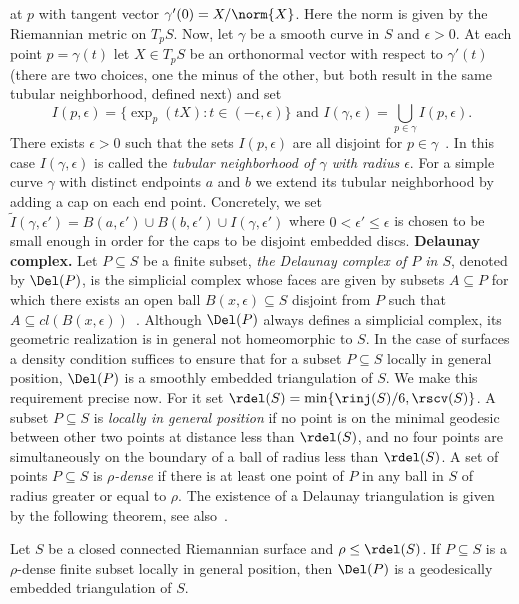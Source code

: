 at $p$ with tangent vector $\gamma'(0)=X/\norm{X}$. Here the norm is given by the Riemannian metric on $T_pS$.
Now, let $\gamma$ be a smooth curve in $S$ and $\epsilon>0$.
At each point $p=\gamma(t)$ let $X\in T_pS$ be an orthonormal vector with respect to $\gamma'(t)$ (there are two choices, one the minus of the other, but both result in the same tubular  neighborhood, defined next) and set
$$I(p,\epsilon) = \{ \exp_p(tX) \colon t\in (-\epsilon,\epsilon)\} \text{ and } I(\gamma,\epsilon) = \bigcup_{p\in \gamma} I(p,\epsilon).$$
There exists $\epsilon>0$ such that the sets $I(p,\epsilon)$ are all disjoint for $p\in \gamma$~\cite[Proposition 7.26]{oneill83-tubular}.
In this case $I(\gamma,\epsilon)$ is called the \emph{tubular neighborhood of $\gamma$ with radius $\epsilon$}.
For a simple curve $\gamma$ with distinct endpoints $a$ and $b$ we extend its tubular neighborhood by adding a cap on
each end point. Concretely, we set $\tilde{I}(\gamma,\epsilon') = B(a,\epsilon')\cup B(b,\epsilon')\cup I(\gamma, \epsilon')$
where $0<\epsilon'\leq \epsilon$ is chosen to be small enough in order for the caps to be disjoint embedded discs.
%
\vspace{3mm}
\noindent
{\bf Delaunay complex.} Let $P\subseteq S$ be a finite subset,
\emph{the Delaunay complex of $P$ in $S$}, denoted by $\Del(P)$,
is the simplicial complex whose faces are given by subsets $A \subseteq P$
for which there exists an open ball $B(x,\epsilon)\subseteq S$ disjoint from $P$
such that $A \subseteq cl (B(x,\epsilon))$~\cite{delaunay34-sphere}.
Although $\Del(P)$ always defines a simplicial complex, its geometric realization is in general not homeomorphic to $S$.
In the case of surfaces a density condition suffices to ensure that for a subset $P\subseteq S$ locally in general position, $\Del(P)$ is a smoothly embedded triangulation of $S$. 
We make this requirement precise now. For it set $\rdel(S) = \min\{\rinj(S)/6, \rscv(S)\}$.
A subset $P\subseteq S$ is \emph{locally in general position} if no point is on the minimal geodesic between other two points at distance less than $\rdel(S)$, and no four points are simultaneously on the boundary of a ball of radius less than $\rdel(S)$.
A set of points $P\subseteq S$ is \emph{$\rho$-dense} if there is at least one point of $P$
in any ball in $S$ of radius greater or equal to $\rho$.
The existence of a Delaunay triangulation is given by the following theorem,
see also~\cite[Theorem 2]{dyer08-surface}.
%
\begin{theorem}
  \label{t:deltriang}
  Let $S$ be a closed connected Riemannian surface and $\rho \leq \rdel(S)$.
  If $P\subseteq S$ is a $\rho$-dense finite subset locally in general position,
  then $\Del(P)$ is a geodesically embedded triangulation of $S$. 
\end{theorem}
